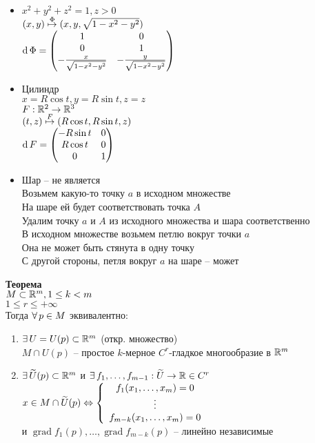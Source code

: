 \documentclass[12pt]{article}
\DeclareMathOperator{\grad}{grad}
\begin{document}
\begin{itemize}
    \item $x^2+y^2+z^2 = 1, z > 0$\\
    $(x,y) \overset \Phi \mapsto (x,y, \sqrt{1-x^2-y^2})$\\
    $\operatorname{d} \Phi = \begin{pmatrix}
        1 & 0\\
        0 & 1\\
        -\frac{x}{\sqrt{1-x^2-y^2}} & -\frac{y}{\sqrt{1-x^2-y^2}}
    \end{pmatrix}$
    \item Цилиндр\\
    $x=R\cos t, y = R\sin t, z = z$\\
    $F: \mathbb{R}^2 \rightarrow \mathbb{R}^3$\\
    $(t, z) \overset F\mapsto (R\cos t, R\sin t, z)$\\
    $\operatorname{d} F = \begin{pmatrix}
        -R\sin t & 0\\
        R\cos t & 0\\
        0 & 1
    \end{pmatrix}$
    \item Шар -- не является\\
    Возьмем какую-то точку $a$ в исходном множестве\\
    На шаре ей будет соответствовать точка $A$\\
    Удалим точку $a$ и $A$ из исходного множества и шара соответственно\\
    В исходном множестве возьмем петлю вокруг точки $a$\\
    Она не может быть стянута в одну точку\\
    С другой стороны, петля вокруг $a$ на шаре -- может
\end{itemize}
\textbf{Теорема}\\
$M\subset \mathbb{R}^m, 1 \leq k < m$\\
$1 \leq r \leq +\infty$\\
Тогда $\forall\, p \in M$ эквивалентно:
\begin{enumerate}
    \item $\exists\, U = U(p) \subset \mathbb{R}^m$ (откр. множество)\\
    $M \cap U(p)$ -- простое $k$-мерное $C^r$-гладкое многообразие в $\mathbb{R}^m$
    \item $\exists\, \widetilde U(p)\subset \mathbb{R}^m$ и $\exists\, f_1,\ldots, f_{m-1}: \widetilde U\rightarrow \mathbb{R} \in C^r$\\
    $x\in M\cap \widetilde U(p)\Leftrightarrow \left\{\begin{array}{c}
        f_1(x_1,\ldots, x_m) = 0\\
        \vdots\\
        f_{m-k}(x_1,\ldots, x_m) = 0
    \end{array}\right.$\\
    и $\grad f_1(p), \ldots, \grad f_{m-k} (p)$ -- линейно независимые
\end{enumerate}
\end{document}
